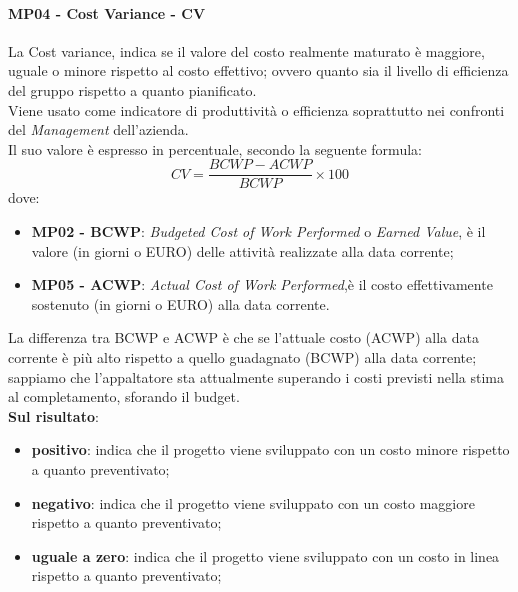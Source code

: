 	 \paragraph{MP04 - Cost Variance - CV}
	 La Cost variance, indica se il valore del costo realmente maturato è maggiore, uguale o minore rispetto al costo effettivo; ovvero quanto sia il livello di efficienza del gruppo rispetto a quanto pianificato. \\
	 Viene usato come indicatore di produttività o efficienza soprattutto nei confronti del {\itshape Management} dell'azienda. \\
	 Il suo valore è espresso in percentuale, secondo la seguente formula:
	 \begin{displaymath}
	 	CV = \frac{BCWP - ACWP}{BCWP}\times100
	 \end{displaymath}
 		dove:
 		\begin{itemize}
 			\item {\bfseries MP02 - BCWP}: {\itshape Budgeted Cost of Work Performed} o {\itshape
 				Earned Value}, è il valore (in giorni o EURO) delle attività realizzate alla data corrente;
 			\item {\bfseries MP05 - ACWP}: {\itshape Actual Cost of Work Performed},è il costo effettivamente sostenuto (in giorni o EURO) alla data corrente.
 		\end{itemize}
 		La differenza tra BCWP e ACWP è che se l'attuale costo (ACWP) alla data corrente è più alto rispetto a quello guadagnato (BCWP) alla data corrente; sappiamo che l'appaltatore sta attualmente superando i costi previsti nella stima al completamento, sforando il budget.	\\

 		{\bfseries Sul risultato}:
 		\begin{itemize}
 			\item {\bfseries positivo}: indica che il progetto viene sviluppato con un costo minore rispetto a quanto preventivato;
 			\item {\bfseries negativo}:  indica che il progetto viene sviluppato con un costo maggiore rispetto a quanto preventivato;
 			\item {\bfseries uguale a zero}: indica che il progetto viene sviluppato con un costo in linea rispetto a quanto preventivato;\\
 		\end{itemize}


